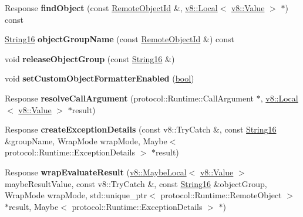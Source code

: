 \begin{DoxyCompactItemize}
\mbox{\label{classv8__inspector_1_1InjectedScript_ab49350c4ef1feba05e53285cd1ee30bc}} 
Response {\bfseries find\+Object} (const \mbox{\hyperlink{classv8__inspector_1_1RemoteObjectId}{Remote\+Object\+Id}} \&, \mbox{\hyperlink{classv8_1_1Local}{v8\+::\+Local}}$<$ \mbox{\hyperlink{classv8_1_1Value}{v8\+::\+Value}} $>$ $\ast$) const
\item 
\mbox{\label{classv8__inspector_1_1InjectedScript_add2681d0ca4575cc27082a68e54b41bb}} 
\mbox{\hyperlink{classv8__inspector_1_1String16}{String16}} {\bfseries object\+Group\+Name} (const \mbox{\hyperlink{classv8__inspector_1_1RemoteObjectId}{Remote\+Object\+Id}} \&) const
\item 
\mbox{\label{classv8__inspector_1_1InjectedScript_a3d4c7cc305cf1b7b1b1fbe13cd4cb615}} 
void {\bfseries release\+Object\+Group} (const \mbox{\hyperlink{classv8__inspector_1_1String16}{String16}} \&)
\item 
\mbox{\label{classv8__inspector_1_1InjectedScript_a3962d99cc34ac149e791f2d4391df557}} 
void {\bfseries set\+Custom\+Object\+Formatter\+Enabled} (\mbox{\hyperlink{classbool}{bool}})
\item 
\mbox{\label{classv8__inspector_1_1InjectedScript_a3e9f2f39f8d29a4d56bd3bad0c3b5ac7}} 
Response {\bfseries resolve\+Call\+Argument} (protocol\+::\+Runtime\+::\+Call\+Argument $\ast$, \mbox{\hyperlink{classv8_1_1Local}{v8\+::\+Local}}$<$ \mbox{\hyperlink{classv8_1_1Value}{v8\+::\+Value}} $>$ $\ast$result)
\item 
\mbox{\label{classv8__inspector_1_1InjectedScript_ae486162e53ac4704494634c8169271d1}} 
Response {\bfseries create\+Exception\+Details} (const v8\+::\+Try\+Catch \&, const \mbox{\hyperlink{classv8__inspector_1_1String16}{String16}} \&group\+Name, Wrap\+Mode wrap\+Mode, Maybe$<$ protocol\+::\+Runtime\+::\+Exception\+Details $>$ $\ast$result)
\item 
\mbox{\label{classv8__inspector_1_1InjectedScript_af5487d827413dc9887f87e42ad823ced}} 
Response {\bfseries wrap\+Evaluate\+Result} (\mbox{\hyperlink{classv8_1_1MaybeLocal}{v8\+::\+Maybe\+Local}}$<$ \mbox{\hyperlink{classv8_1_1Value}{v8\+::\+Value}} $>$ maybe\+Result\+Value, const v8\+::\+Try\+Catch \&, const \mbox{\hyperlink{classv8__inspector_1_1String16}{String16}} \&object\+Group, Wrap\+Mode wrap\+Mode, std\+::unique\+\_\+ptr$<$ protocol\+::\+Runtime\+::\+Remote\+Object $>$ $\ast$result, Maybe$<$ protocol\+::\+Runtime\+::\+Exception\+Details $>$ $\ast$)

\end{DoxyCompactItemize}
